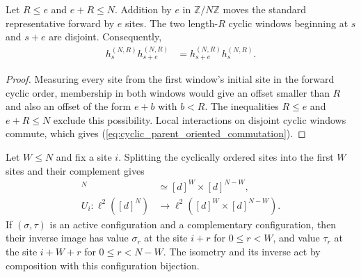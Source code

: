 \begin{lemma}
    \label{thm:cyclic_parent_oriented_separation}
    \leanok
    Let $R\leq e$ and $e+R\leq N$.  Addition by $e$ in
    $\mathbb Z/N\mathbb Z$ moves the standard representative forward by $e$
    sites.  The two length-$R$ cyclic windows beginning at $s$ and $s+e$ are
    disjoint.  Consequently,
    \begin{align}
        h_s^{(N,R)}h_{s+e}^{(N,R)}
         & =h_{s+e}^{(N,R)}h_s^{(N,R)}.
        \label{eq:cyclic_parent_oriented_commutation}
    \end{align}
\end{lemma}

\begin{proof}
    \leanok
    Measuring every site from the first window's initial site in the forward
    cyclic order, membership in both windows would give an offset smaller
    than $R$ and also an offset of the form $e+b$ with $b<R$.  The inequalities
    $R\leq e$ and $e+R\leq N$ exclude this possibility.  Local interactions on
    disjoint cyclic windows commute, which gives
    (\ref{eq:cyclic_parent_oriented_commutation}).
\end{proof}

\begin{definition}
    \label{def:cyclic_active_block_coordinates}
    \leanok
    Let $W\leq N$ and fix a site $i$.  Splitting the cyclically ordered sites
    into the first $W$ sites and their complement gives
    \begin{align}
        [d]^N & \simeq [d]^W\times[d]^{N-W},                 \\
        U_i\colon\ell^2([d]^N)
              & \longrightarrow\ell^2([d]^W\times[d]^{N-W}).
        \label{eq:cyclic_active_block_isometry}
    \end{align}
    If $(\sigma,\tau)$ is an active configuration and a complementary
    configuration, then their inverse image has value $\sigma_r$ at the site
    $i+r$ for $0\leq r<W$, and value $\tau_r$ at the site $i+W+r$ for
    $0\leq r<N-W$.  The isometry and its inverse act by composition with this
    configuration bijection.
\end{definition}

